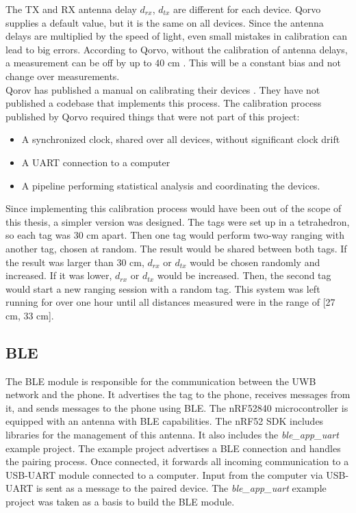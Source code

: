 The TX and RX antenna delay $d_{rx}$, $d_{tx}$ are different for each device.
Qorvo supplies a default value, but it is the same on all devices.
Since the antenna delays are multiplied by the speed of light, even small mistakes in calibration can lead to big errors.
According to Qorvo, without the calibration of antenna delays, a measurement can be off by up to 40 cm \cite{DWM3000Calib}.
This will be a constant bias and not change over measurements.\\
Qorov has published a manual on calibrating their devices \cite{DWM3000Calib}.
They have not published a codebase that implements this process.
The calibration process published by Qorvo required things that were not part of this project:
\begin{itemize}
	\item A synchronized clock, shared over all devices, without significant clock drift
	\item A UART connection to a computer
	\item A pipeline performing statistical analysis and coordinating the devices.
\end{itemize} 
Since implementing this calibration process would have been out of the scope of this thesis, a simpler version was designed.
The tags were set up in a tetrahedron, so each tag was 30 cm apart.
Then one tag would perform two-way ranging with another tag, chosen at random.
The result would be shared between both tags.
If the result was larger than 30 cm, $d_{rx}$ or $d_{tx}$ would be chosen randomly and increased.
If it was lower, $d_{rx}$ or $d_{tx}$ would be increased.
Then, the second tag would start a new ranging session with a random tag.
This system was left running for over one hour until all distances measured were in the range of [27 cm, 33 cm].


\subsection{BLE}
\label{ss:ble_module}
The BLE module is responsible for the communication between the UWB network and the phone.
It advertises the tag to the phone, receives messages from it, and sends messages to the phone using BLE.
The nRF52840 microcontroller is equipped with an antenna with BLE capabilities.
The nRF52 SDK includes libraries for the management of this antenna.
It also includes the \textit{ble{\_}app{\_}uart} example project.
The example project advertises a BLE connection and handles the pairing process.
Once connected, it forwards all incoming communication to a USB-UART module connected to a computer.
Input from the computer via USB-UART is sent as a message to the paired device.
The  \textit{ble{\_}app{\_}uart} example project was taken as a basis to build the BLE module.


